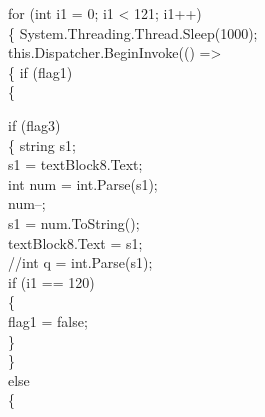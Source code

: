 {{            for (int i1 = 0; i1 < 121; i1++)\\
            \{
                System.Threading.Thread.Sleep(1000);\\

                this.Dispatcher.BeginInvoke(() =>\\
                \{
                    if (flag1)\\
                    \{

                        if (flag3)\\
                        \{
                            string s1;\\
                            s1 = textBlock8.Text;\\
                            int num = int.Parse(s1);\\
                            num--;\\
                            s1 = num.ToString();\\
                            textBlock8.Text = s1;\\
                            //int q = int.Parse(s1);\\
                            if (i1 == 120)\\
                            \{\\
                                flag1 = false;\\
                            \}\\
                        \}\\
                        else\\
                        \{

}}
